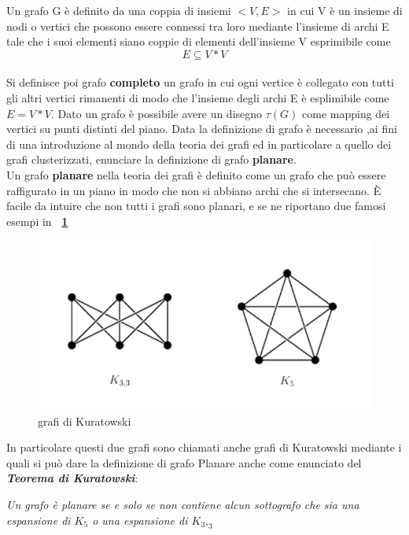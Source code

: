 {Un grafo G è definito da una coppia di insiemi \textbf{$<V,E>$} in cui V è un insieme di nodi o vertici che possono essere connessi tra loro mediante l'insieme di archi E tale che i suoi elementi siano coppie di elementi dell'insieme V esprimibile come $$E \subseteq V * V$$ \\
Si definisce poi grafo \textbf{completo} un grafo in cui ogni vertice è collegato con tutti gli altri vertici rimanenti di modo che l'insieme degli archi E è esplimibile come $E= V * V$.
Dato un grafo è possibile avere un disegno $\tau(G)$ come mapping dei vertici su punti distinti del piano.
Data la definizione di grafo è necessario ,ai fini di una introduzione al mondo della teoria dei grafi ed in particolare a quello dei grafi clusterizzati, enunciare la definizione di grafo \textbf{planare}.\\
Un grafo\textbf{ planare }nella teoria dei grafi è definito come un grafo che può essere raffigurato in un piano in modo che non si abbiano archi che si intersecano. È facile da intuire che non tutti i grafi sono planari, e se ne riportano due famosi esempi in \textbf{\figurename~\ref{fig:kuratowski}}
\begin{figure}[!htb]
	\begin{center}
		\includegraphics[width=0.9 \linewidth]{figure/kuratowski}
	\end{center}
	\caption{grafi di Kuratowski \label{fig:kuratowski}}
\end{figure}
\newline
In particolare questi due grafi sono chiamati anche grafi di Kuratowski mediante i quali si può dare la definizione di grafo Planare anche come enunciato del \textit{\textbf{Teorema di Kuratowski}}:
\begin{center}
\textit{	Un grafo è planare \textit{se e solo se} non contiene alcun sottografo che sia una espansione di $K_5 $ o una espansione di $K_3,_3$\\}

\end{center}}
